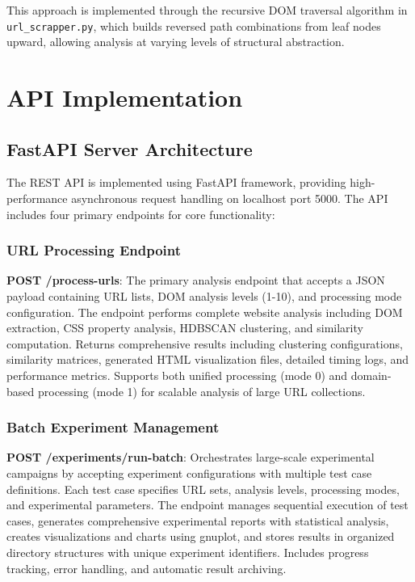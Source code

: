 This approach is implemented through the recursive DOM traversal algorithm in \texttt{url\_scrapper.py}, which builds reversed path combinations from leaf nodes upward, allowing analysis at varying levels of structural abstraction.

\section{API Implementation}
\label{sec:api-implementation}

\subsection{FastAPI Server Architecture}
The REST API is implemented using FastAPI framework, providing high-performance asynchronous request handling on localhost port 5000. The API includes four primary endpoints for core functionality:

\subsubsection{URL Processing Endpoint}
\textbf{POST /process-urls}: The primary analysis endpoint that accepts a JSON payload containing URL lists, DOM analysis levels (1-10), and processing mode configuration. The endpoint performs complete website analysis including DOM extraction, CSS property analysis, HDBSCAN clustering, and similarity computation. Returns comprehensive results including clustering configurations, similarity matrices, generated HTML visualization files, detailed timing logs, and performance metrics. Supports both unified processing (mode 0) and domain-based processing (mode 1) for scalable analysis of large URL collections.

\subsubsection{Batch Experiment Management}
\textbf{POST /experiments/run-batch}: Orchestrates large-scale experimental campaigns by accepting experiment configurations with multiple test case definitions. Each test case specifies URL sets, analysis levels, processing modes, and experimental parameters. The endpoint manages sequential execution of test cases, generates comprehensive experimental reports with statistical analysis, creates visualizations and charts using gnuplot, and stores results in organized directory structures with unique experiment identifiers. Includes progress tracking, error handling, and automatic result archiving.

